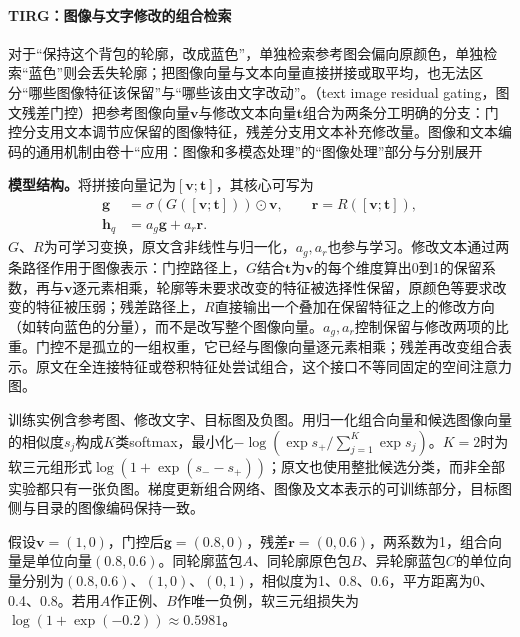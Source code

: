 \paragraph{TIRG：图像与文字修改的组合检索}
\label{sec:rs-search-tirg}

对于“保持这个背包的轮廓，改成蓝色”，单独检索参考图会偏向原颜色，单独检索“蓝色”则会丢失轮廓；把图像向量与文本向量直接拼接或取平均，也无法区分“哪些图像特征该保留”与“哪些该由文字改动”。（text image residual gating，图文残差门控）把参考图像向量$\bm v$与修改文本向量$\bm t$组合为两条分工明确的分支：门控分支用文本调节应保留的图像特征，残差分支用文本补充修改量。图像和文本编码的通用机制由卷十“应用：图像和多模态处理”的“图像处理”部分与分别展开

\textbf{模型结构。}将拼接向量记为$[\bm v;\bm t]$，其核心可写为
\begin{equation}
 \begin{split}
 \bm g&=\sigma(G([\bm v;\bm t]))\odot\bm v,\qquad
 \bm r=R([\bm v;\bm t]),\\
 \bm h_q&=a_g\bm g+a_r\bm r .
 \end{split}
 \label{eq:rs-search-tirg}
\end{equation}
$G$、$R$为可学习变换，原文含非线性与归一化，$a_g,a_r$也参与学习。修改文本通过两条路径作用于图像表示：门控路径上，$G$结合$\bm t$为$\bm v$的每个维度算出0到1的保留系数，再与$\bm v$逐元素相乘，轮廓等未要求改变的特征被选择性保留，原颜色等要求改变的特征被压弱；残差路径上，$R$直接输出一个叠加在保留特征之上的修改方向（如转向蓝色的分量），而不是改写整个图像向量。$a_g,a_r$控制保留与修改两项的比重。门控不是孤立的一组权重，它已经与图像向量逐元素相乘；残差再改变组合表示。原文在全连接特征或卷积特征处尝试组合，这个接口不等同固定的空间注意力图。

训练实例含参考图、修改文字、目标图及负图。用归一化组合向量和候选图像向量的相似度$s_j$构成$K$类softmax，最小化$-\log(\exp s_+/\sum_{j=1}^K\exp s_j)$。$K=2$时为软三元组形式$\log(1+\exp(s_--s_+))$；原文也使用整批候选分类，而非全部实验都只有一张负图。梯度更新组合网络、图像及文本表示的可训练部分，目标图侧与目录的图像编码保持一致。

假设$\bm v=(1,0)$，门控后$\bm g=(0.8,0)$，残差$\bm r=(0,0.6)$，两系数为1，组合向量是单位向量$(0.8,0.6)$。同轮廓蓝包$A$、同轮廓原色包$B$、异轮廓蓝包$C$的单位向量分别为$(0.8,0.6)$、$(1,0)$、$(0,1)$，相似度为1、0.8、0.6，平方距离为0、0.4、0.8。若用$A$作正例、$B$作唯一负例，软三元组损失为$\log(1+\exp(-0.2))\approx0.5981$。

